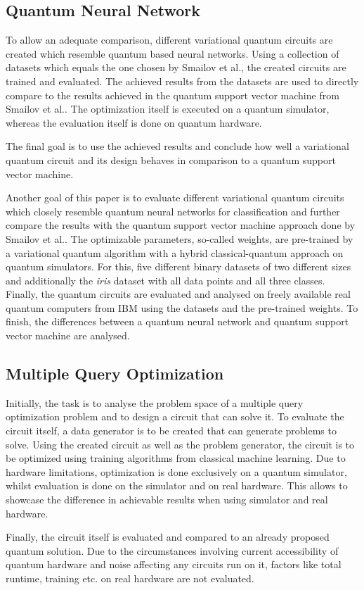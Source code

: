 \subsection{Quantum Neural Network}
To allow an adequate comparison, different variational quantum circuits are created which resemble quantum based neural networks. Using a collection of datasets which equals the one chosen by Smailov et al.\cite{smailovQuantumMachineLearning2021}, the created circuits are trained and evaluated. The achieved results from the datasets are used to directly compare to the results achieved in the quantum support vector machine from Smailov et al.\cite{smailovQuantumMachineLearning2021}. The optimization itself is executed on a quantum simulator, whereas the evaluation itself is done on quantum hardware. \par
The final goal is to use the achieved results and conclude how well a variational quantum circuit and its design behaves in comparison to a quantum support vector machine.\par
Another goal of this paper is to evaluate different variational quantum circuits which closely resemble quantum neural networks for classification and further compare the results with the quantum support vector machine approach done by Smailov et al.\cite{smailovQuantumMachineLearning2021}. The optimizable parameters, so-called weights, are pre-trained by a variational quantum algorithm with a hybrid classical-quantum approach on quantum simulators. For this, five different binary datasets of two different sizes and additionally the \textit{iris} dataset with all data points and all three classes. Finally, the quantum circuits are evaluated and analysed on freely available real quantum computers from IBM using the datasets and the pre-trained weights. To finish, the differences between a quantum neural network and quantum support vector machine are analysed.


\subsection{Multiple Query Optimization}
Initially, the task is to analyse the problem space of a multiple query optimization problem and to design a circuit that can solve it. To evaluate the circuit itself, a data generator is to be created that can generate problems to solve. 
Using the created circuit as well as the problem generator, the circuit is to be optimized using training algorithms from classical machine learning. Due to hardware limitations, optimization is done exclusively on a quantum simulator, whilst evaluation is done on the simulator and on real hardware. This allows to showcase the difference in achievable results when using simulator and real hardware.\par
Finally, the circuit itself is evaluated and compared to an already proposed quantum solution\cite{fankhauser_multiple_2021}. Due to the circumstances involving current accessibility of quantum hardware and noise affecting any circuits run on it, factors like total runtime, training etc. on real hardware are not evaluated.

\clearpage
